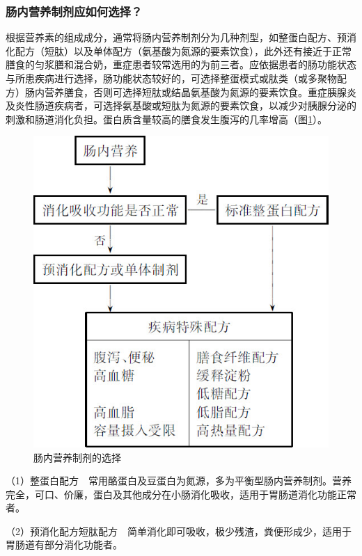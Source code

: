\subsubsection{肠内营养制剂应如何选择？}

根据营养素的组成成分，通常将肠内营养制剂分为几种剂型，如整蛋白配方、预消化配方（短肽）以及单体配方（氨基酸为氮源的要素饮食），此外还有接近于正常膳食的匀浆膳和混合奶，重症患者较常选用的为前三者。应依据患者的肠功能状态与所患疾病进行选择，肠功能状态较好的，可选择整蛋模式或肽类（或多聚物配方）肠内营养膳食，否则可选择短肽或结晶氨基酸为氮源的要素饮食。重症胰腺炎及炎性肠道疾病者，可选择氨基酸或短肽为氮源的要素饮食，以减少对胰腺分泌的刺激和肠道消化负担。蛋白质含量较高的膳食发生腹泻的几率增高（图\ref{fig22-1}）。

\begin{figure}[!htbp]
 \centering
 \includegraphics{./images/Image00260.jpg}
 \captionsetup{justification=centering}
 \caption{肠内营养制剂的选择}
 \label{fig22-1}
  \end{figure} 

（1）整蛋白配方　常用酪蛋白及豆蛋白为氮源，多为平衡型肠内营养制剂。营养完全，可口、价廉，蛋白及其他成分在小肠消化吸收，适用于胃肠道消化功能正常者。

（2）预消化配方短肽配方　简单消化即可吸收，极少残渣，粪便形成少，适用于胃肠道有部分消化功能者。

